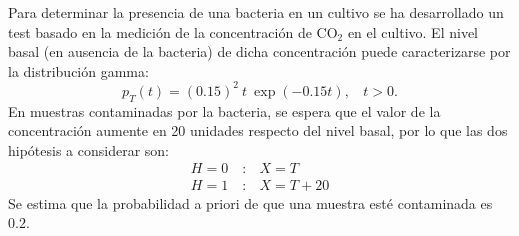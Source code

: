 \ifspanish

\question[25] %

Para determinar la presencia de una bacteria en un cultivo se ha desarrollado un test basado en la medición de la concentración de $\text{CO}_2$ en el cultivo. El nivel basal (en ausencia de la bacteria) de dicha concentración puede caracterizarse por la distribución gamma:
$$ p_T(t) = (0.15)^2 ~  t ~  \exp(-0.15 t), ~~~~t > 0. 
$$
En muestras contaminadas por la bacteria, se espera que el valor de la concentración aumente en 20 unidades respecto del nivel basal, por lo que las dos hipótesis a considerar son:
\begin{equation}
\begin{array}{ll}
H=0\quad: & X = T \\
H=1\quad: & X = T + 20
\end{array}
\end{equation}
Se estima que la probabilidad a priori de que una muestra esté contaminada es $0.2$.


